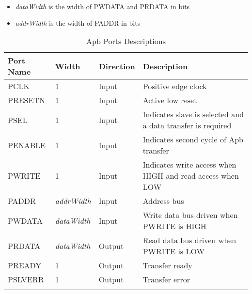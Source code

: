 \begin{itemize}[noitemsep]
  \item \textit{dataWidth} is the width of PWDATA and PRDATA in bits
  \item \textit{addrWidth} is the width of PADDR in bits
\end{itemize}
 
\renewcommand*{\arraystretch}{1.4}
\begin{longtable}[H]{
  | p{}
  | p{}
  | p{}
  | p{} |
  }
  \hline
  \textbf{Port Name} &   
  \textbf{Width} &   
  \textbf{Direction} &   
  \textbf{Description} \\ \hline \hline

  PCLK &       
  1 &       
  Input &       
  Positive edge clock \\ \hline

  PRESETN &       
  1 &       
  Input &       
  Active low reset \\ \hline

  PSEL &       
  1 & 
  Input &       
  Indicates slave is selected and a data transfer is required \\ \hline

  PENABLE &        
  1 & 
  Input &       
  Indicates second cycle of Apb transfer \\ \hline

  PWRITE &        
  1 & 
  Input &       
  Indicates write access when HIGH and read access when LOW\\ \hline

  PADDR &      
  \textit{addrWidth} & 
  Input &     
  Address bus \\ \hline

  PWDATA &      
  \textit{dataWidth} & 
  Input &     
  Write data bus driven when PWRITE is HIGH\\ \hline

  PRDATA &      
  \textit{dataWidth} & 
  Output &     
  Read data bus driven when PWRITE is LOW\\ \hline
 
  PREADY &        
  1 & 
  Output &       
  Transfer ready \\ \hline

  PSLVERR &        
  1 & 
  Output &       
  Transfer error \\ \hline

  \caption{Apb Ports Descriptions}\label{table:interface}
\end{longtable}


